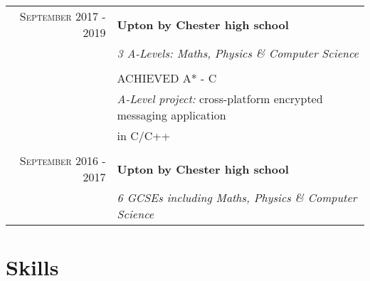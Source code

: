 \documentclass[a4paper,10pt]{article} %
\begin{document}
\begin{tabular}{rl}
\textsc{September} 2017 - \textsc{2019} & \textbf{Upton by Chester high school} \\
&\normalsize \textit{3 A-Levels: Maths, Physics \& Computer Science} \\
&\\
&\textsc{ACHIEVED A* - C} \\
&\normalsize \textit{A-Level project:} cross-platform encrypted messaging application \\
& in C/C++ \\
&\\

\textsc{September} 2016 - \textsc{2017} & \textbf{Upton by Chester high school} \\
&\normalsize \textit{6 GCSEs including Maths, Physics \& Computer Science}

\end{tabular}


\section{Skills}
\end{document}
